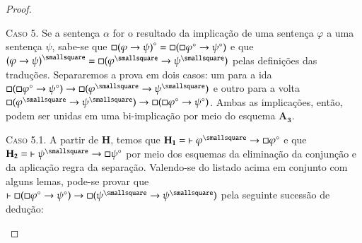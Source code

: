 \begin{theorem}
\begin{proof}
            \begin{case}
                \textsc{Caso 5.}
                Se a sentença $\alpha$ for o resultado da implicação de uma sentença $\varphi$ a uma sentença $\psi$, sabe-se que $\mathord{\square}{(\varphi\to\psi)}^\circ=\mathord{\square}(\mathord{\square}\varphi^\circ\to\psi^\circ)$ e que ${(\varphi\to\psi)}^\smallsquare=\nec(\varphi^\smallsquare\to\psi^\smallsquare)$ pelas definições das traduções.
                Separaremos a prova em dois casos: um para a ida $\nec(\nec\varphi^\circ\to\psi^\circ)\to\nec(\varphi^\smallsquare\to\psi^\smallsquare)$ e outro para a volta $\nec(\varphi^\smallsquare\to\psi^\smallsquare)\to\nec(\nec\varphi^\circ\to\psi^\circ)$.
                Ambas as implicações, então, podem ser unidas em uma bi-implicação por meio do esquema \hyperref[MA3]{$\mathbf{A_3}$}.
            \end{case}

                \begin{subcase}
                    \textsc{Caso 5.1.}
                    A partir de $\mathbf{H}$, temos que $\mathbf{H_1}={\entails\varphi^\smallsquare\to\nec\varphi^\circ}$ e que $\mathbf{H_2}={\entails\psi^\smallsquare\to\nec\psi^\circ}$ por meio dos esquemas da eliminação da conjunção e da aplicação regra da separação.
                    Valendo-se do listado acima em conjunto com alguns lemas, pode-se provar que $\entails\nec(\nec\varphi^\circ\to\psi^\circ)\to\nec(\psi^\smallsquare\to\psi^\smallsquare)$ pela seguinte sucessão de dedução:


\end{subcase}
\end{proof}
\end{theorem}
